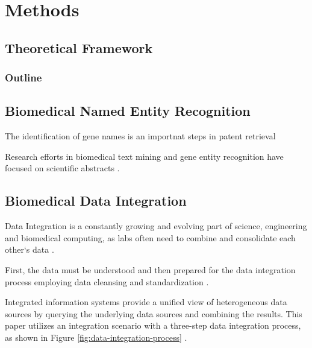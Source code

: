 \part{Methods}

\chapter{Theoretical Framework}
\label{cha:theory}

\section{Outline}

\chapter{Biomedical Named Entity Recognition}

The identification of gene names is an importnat steps in patent retrieval

Research efforts in biomedical text mining and gene entity recognition have focused on scientific abstracts \cite{RodriguezEsteban2016TextMP}.

\chapter{Biomedical Data Integration}

Data Integration is a constantly growing and evolving part of science, engineering and biomedical computing, as labs often need to combine and consolidate each other`s data \cite{Bernstein2008InformationII}.

First, the data must be understood and then prepared for the data integration process employing data cleansing and standardization \cite{Bernstein2008InformationII}.

Integrated information systems provide a unified view of heterogeneous data sources by querying the underlying data sources and combining the results. This paper utilizes an integration scenario with a three-step data integration process, as shown in Figure \ref{fig:data-integration-process} \cite{Bleiholder2009DataF}.

